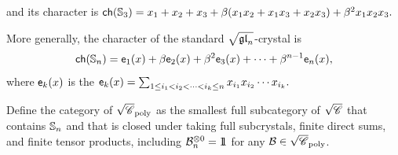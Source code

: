 \documentclass[11pt]{article}
\begin{document}
\begin{example}
\[%
\]
and its character is
$
\mathsf{ch}(\mathbb{S}_3) = x_1 + x_2 + x_3 + \beta ( x_1 x_2 + x_1 x_3 + x_2 x_3) + \beta^2 x_1 x_2 x_3.
$
\end{example}

More generally,  the character of the standard $\sqrt{\mathfrak{gl}_n}$-crystal is
\[
\mathsf{ch}(\mathbb{S}_n) = \mathsf{e}_1(x) +\beta \mathsf{e}_2(x) + \beta^2 \mathsf{e}_3(x) + \cdots +\beta^{n-1} \mathsf{e}_n(x),
\]
where $\mathsf{e}_k(x)$ is the 
$
\mathsf{e}_k(x) = 
 \sum_{1\leq i_1<i_2<\dots<i_k\leq n} x_{i_1} x_{i_2} \cdots x_{i_k}.
$

\begin{definition}
Define the category of  $\sqrt{\mathscr{C}}_{\operatorname{poly}}$ as the smallest full subcategory of $\sqrt{\mathscr{C}}$ that contains $\mathbb{S}_n$ and that is closed under taking {full} subcrystals, finite direct sums, and finite tensor products, including $\cB_n^{\otimes 0} = \one$ for any $\mathcal{B} \in \sqrt{\mathscr{C}}_{\operatorname{poly}}$.
\end{definition}
\end{document}
